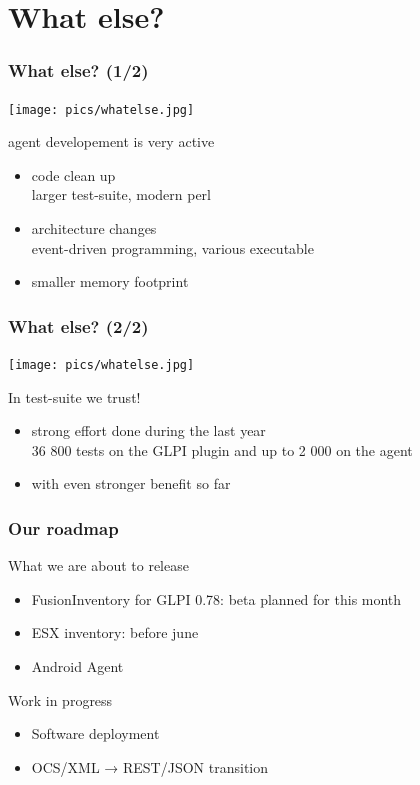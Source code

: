 \documentclass{beamer}
\begin{document}
\section{What else?}


\begin{frame}
    \frametitle{What else? (1/2)}

    \begin{center}
    \texttt{[image: pics/whatelse.jpg]}
    \end{center}

    \pause

    \begin{block}{agent developement is very active}
        \begin{itemize}
            \item code clean up\\
            {\small larger test-suite, modern perl}
            \item architecture changes\\
            {\small event-driven programming, various executable}
            \item smaller memory footprint
        \end{itemize}
    \end{block}
\end{frame}

\begin{frame}
    \frametitle{What else? (2/2)}

    \begin{center}
    \texttt{[image: pics/whatelse.jpg]}
    \end{center}

    \begin{block}{In test-suite we trust!}
        \begin{itemize}
            \item strong effort done during the last year \\
            \small{36 800 tests on the GLPI plugin and up to 2 000 on the agent}
            \item with even stronger benefit so far
        \end{itemize}
    \end{block}
\end{frame}

\begin{frame}
    \frametitle{Our roadmap}

    What we are about to release
    \begin{itemize}
    \item FusionInventory for GLPI 0.78: beta planned for this month
    \item ESX inventory: before june
    \item Android Agent
    \end{itemize}

    Work in progress
    \begin{itemize}
    \item Software deployment
    \item OCS/XML → REST/JSON transition
    \end{itemize}
\end{frame}
\end{document}

